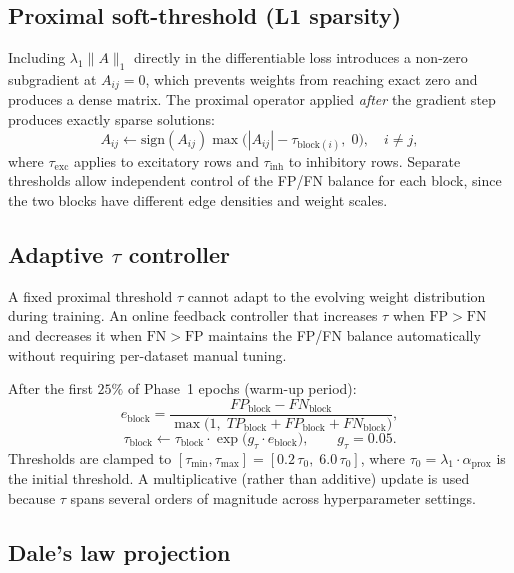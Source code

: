 \documentclass[11pt]{article}
\begin{document}
\subsection{Proximal soft-threshold (L1 sparsity)}

Including $\lambda_1\|A\|_1$ directly in the differentiable loss introduces a
non-zero subgradient at $A_{ij}=0$, which prevents weights from reaching exact zero
and produces a dense matrix.  The proximal operator applied \emph{after} the gradient
step produces exactly sparse solutions:
\begin{equation}
  A_{ij} \leftarrow
  \mathrm{sign}(A_{ij})\max\!\bigl(|A_{ij}|-\tau_{\mathrm{block}(i)},\;0\bigr),
  \quad i\neq j,
\end{equation}
where $\tau_{\mathrm{exc}}$ applies to excitatory rows and $\tau_{\mathrm{inh}}$ to
inhibitory rows.  Separate thresholds allow independent control of the FP/FN balance
for each block, since the two blocks have different edge densities and weight scales.

\subsection{Adaptive $\tau$ controller}

A fixed proximal threshold $\tau$ cannot adapt to the evolving weight distribution
during training.  An online feedback controller that increases $\tau$ when
$\mathrm{FP} > \mathrm{FN}$ and decreases it when $\mathrm{FN} > \mathrm{FP}$
maintains the FP/FN balance automatically without requiring per-dataset manual tuning.

After the first $25\%$ of Phase~1 epochs (warm-up period):
\begin{equation}
  e_{\mathrm{block}} = \frac{FP_{\mathrm{block}}-FN_{\mathrm{block}}}
    {\max\!\bigl(1,\;TP_{\mathrm{block}}+FP_{\mathrm{block}}+FN_{\mathrm{block}}\bigr)},
\end{equation}
\begin{equation}
  \tau_{\mathrm{block}} \leftarrow \tau_{\mathrm{block}}\cdot
    \exp\!\bigl(g_\tau\cdot e_{\mathrm{block}}\bigr),
  \qquad g_\tau = 0.05.
\end{equation}
Thresholds are clamped to
$[\tau_{\min},\tau_{\max}] = [0.2\,\tau_0,\;6.0\,\tau_0]$,
where $\tau_0=\lambda_1\cdot\alpha_{\mathrm{prox}}$ is the initial threshold.
A multiplicative (rather than additive) update is used because $\tau$ spans several
orders of magnitude across hyperparameter settings.

\subsection{Dale's law projection}
\end{document}

